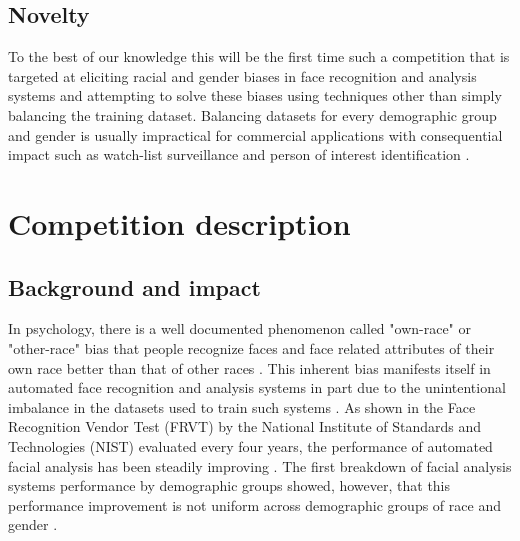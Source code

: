 \documentclass[11pt, oneside]{article}
\makeatletter
\let\@internalcite\cite
\def\cite{\def\citeauthoryear##1##2{##1, ##2}\@internalcite}
\makeatother
\begin{document}
\subsection{Novelty}
To the best of our knowledge this will be the first time such a competition that 
is targeted at eliciting racial and gender biases in face recognition and 
analysis systems and attempting to solve these biases using techniques other 
than simply balancing the training dataset. Balancing datasets for every 
demographic group and gender is usually impractical for commercial applications 
with consequential impact such as watch-list surveillance 
\cite{kamgar2011toward} and person of interest identification 
\cite{best2014unconstrained}.

\section{Competition description}

\subsection{Background and impact}


In psychology, there is a well documented phenomenon called "own-race" or 
"other-race" bias that people recognize faces and face related attributes of 
their own race better than that of other races \cite{furl2002face}. This 
inherent bias manifests itself in automated face recognition and analysis 
systems in part due to the unintentional imbalance in the datasets used to 
train such systems \cite{phillips2011other}. As shown in the Face Recognition 
Vendor Test (FRVT) by the National Institute of Standards and Technologies 
(NIST) evaluated every four years, the performance of automated facial analysis 
has been steadily improving \cite{grother2010report}. The first breakdown of 
facial analysis systems performance by demographic groups showed, however, that 
this performance improvement is not uniform across demographic groups of race 
and gender \cite{phillips2011other}.
\end{document}
